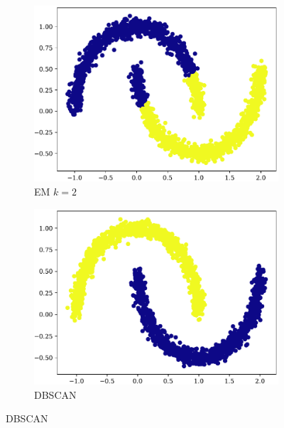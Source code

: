 \begin{figure}[t!]
    \begin{subfigure}[b]{0.45\textwidth}
        \includegraphics[width=\textwidth]{../plots/moons_em.pdf}
        \caption{EM $k = 2$}
        \label{subfig:moon-em}
    \end{subfigure}
    \hspace{0.09\textwidth}
    \begin{subfigure}[b]{0.45\textwidth}
        \includegraphics[width=\textwidth]{../plots/moons_dbscan.pdf}
        \caption{DBSCAN}
        \label{subfig:moon-dbscan}
    \end{subfigure}
\end{figure}
